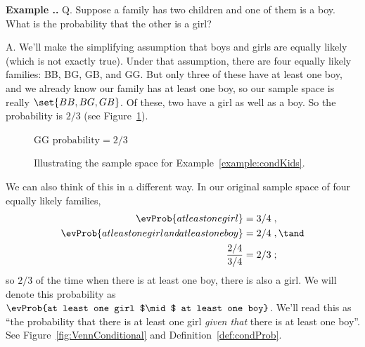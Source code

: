 \documentclass[twoside]{book}\usepackage[]{graphicx}\usepackage[]{xcolor}
\def\question{{\sf Q. }}
\def\answer{{\sf A. }}
\newcounter{example}[section]
\newenvironment{example}%
{\refstepcounter{example}%
\textbf{Example \thesection.\arabic{example}. }}%
{}
\begin{document}
\begin{example}
\label{condKids}%
\label{example:condKids}%
  \question
  Suppose a family has two children and one of them is a boy.
  What is the probability that the other is a girl?

  \answer
  We'll make the simplifying assumption that boys and girls are 
  equally likely (which is not exactly true).  Under that assumption,
  there are four equally likely families:  BB, BG, GB, and GG.  But only three
  of these have at least one boy, and we already know our family has at least one boy, so our sample space is really
  $\set{ BB, BG, GB}$.
  Of these, two have a girl as well as a boy.
  So the probability is $2/3$ (see Figure~\ref{fig:condKids}).  

\begin{figure}[h]
	\begin{center}
	  GG \qquad {}  
	\qquad \qquad $\mbox{probability} = 2/3$
  \end{center}
\caption{Illustrating the sample space for Example~\ref{example:condKids}.}
\label{fig:condKids}%
\end{figure}

  We can also think of this in a different way.   In our original sample space
  of four equally likely families,
  \begin{align*}
	\evProb{at least one girl} & =  3/4 \; , \\ %
	\evProb{at least one girl \emph{and} at least one boy} & =  2/4 \; , \tand\\
	\frac{2/4}{3/4} & =  2/3 \; ;
  \end{align*}
  so $2/3$ of the time when there is at least one boy, there is also a girl.
  We will denote this probability as 
  $\evProb{at least one girl $\mid$ at least one boy}$.
  We'll read this as ``the probability that there is at least one girl \emph{given that} 
  there is at least one boy''.  
  See Figure~\ref{fig:VennConditional} and Definition~\ref{def:condProb}.
\end{example}
\end{document}
